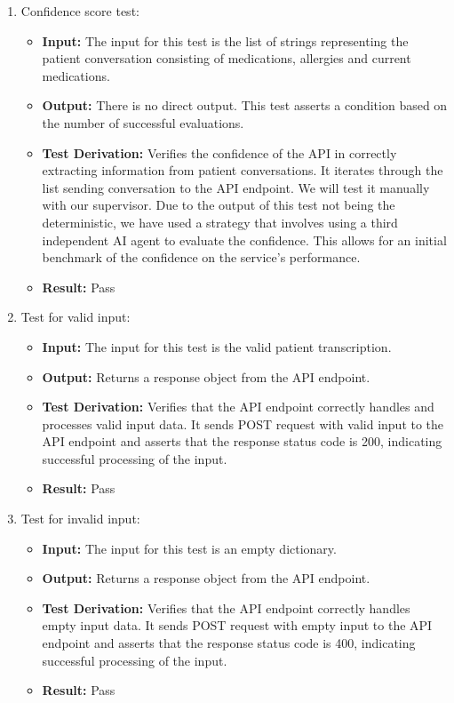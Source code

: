 \documentclass[12pt, titlepage]{article}
\begin{document}
  \begin{enumerate}
    \item Confidence score test:
      \begin{itemize}
        \item \textbf{Input:} The input for this test is the list of strings representing the patient conversation consisting of medications, allergies and current medications.   
        \item \textbf{Output:} There is no direct output. This test asserts a condition based on the number of successful evaluations.
        \item \textbf{Test Derivation:} Verifies the confidence of the API in correctly extracting information from patient conversations. It iterates through the list sending conversation to the API endpoint. We will test it manually with our supervisor. Due to the output of this test not being the deterministic, we have used a strategy that involves using a third independent AI agent to evaluate the confidence. This allows for an initial benchmark of the confidence on the service's performance.  
        \item \textbf{Result:} Pass
      \end{itemize}

    \item Test for valid input:
      \begin{itemize}
        \item \textbf{Input:} The input for this test is the valid patient transcription. 
        \item \textbf{Output:} Returns a response object from the API endpoint. 
        \item \textbf{Test Derivation:} Verifies that the API endpoint correctly handles and processes valid input data. It sends POST request with valid input to the API endpoint and asserts that the response status code is 200, indicating successful processing of the input.
        \item \textbf{Result:} Pass
      \end{itemize}

      \item Test for invalid input:
      \begin{itemize}
        \item \textbf{Input:} The input for this test is an empty dictionary. 
        \item \textbf{Output:} Returns a response object from the API endpoint. 
        \item \textbf{Test Derivation:} Verifies that the API endpoint correctly handles empty input data. It sends POST request with empty input to the API endpoint and asserts that the response status code is 400, indicating successful processing of the input.
        \item \textbf{Result:} Pass
      \end{itemize}
  \end{enumerate}
\end{document}
